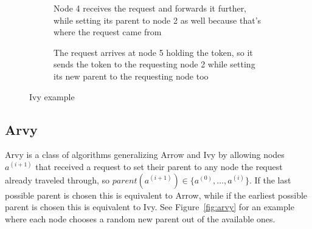 \documentclass[a4paper, oneside]{discothesis}
\begin{document}
\begin{figure}[H]
\begin{subfigure}[t]{0.5\textwidth}
\centering
{}
\caption{Node 4 receives the request and forwards it further, while setting its parent to node 2 as well because that's where the request came from}
\end{subfigure}
\quad
\begin{subfigure}[t]{0.5\textwidth}
\centering
{}
\caption{The request arrives at node 5 holding the token, so it sends the token to the requesting node 2 while setting its new parent to the requesting node too}
\end{subfigure}
\caption{Ivy example}
\label{fig:ivy}
\end{figure}

\subsection{Arvy}

Arvy is a class of algorithms generalizing Arrow and Ivy by allowing nodes $a^{(i+1)}$ that received a request to set their parent to any node the request already traveled through, so $parent(a^{(i+1)})\in\{a^{(0)},\dots,a^{(i)}\}$. If the last possible parent is chosen this is equivalent to Arrow, while if the earliest possible parent is chosen this is equivalent to Ivy. See Figure~\ref{fig:arvy} for an example where each node chooses a random new parent out of the available ones.
\end{document}
